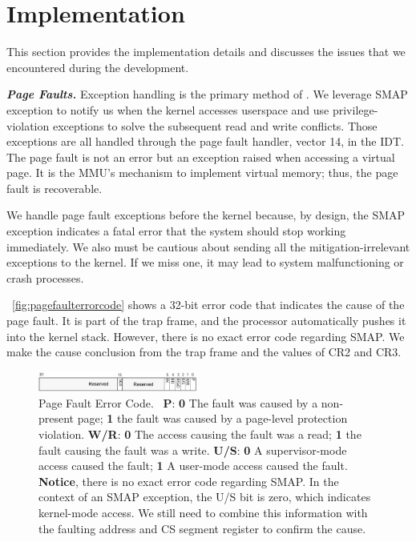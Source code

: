 

\section{Implementation}
\label{sec:ktoctou-implementation}

This section provides the implementation details and discusses the issues that we encountered during the development.


\textbf{\textit{Page Faults.}} Exception handling is the primary method of \name. We leverage SMAP exception to notify us when the kernel accesses userspace and use privilege-violation exceptions to solve the subsequent read and write conflicts. Those exceptions are all handled through the page fault handler, vector 14, in the IDT. The page fault is not an error but an exception raised when accessing a virtual page. It is the MMU's mechanism to implement virtual memory; thus, the page fault is recoverable.

We handle page fault exceptions before the kernel because, by design, the SMAP exception indicates a fatal error that the system should stop working immediately. We also must be cautious about sending all the mitigation-irrelevant exceptions to the kernel. If we miss one, it may lead to system malfunctioning or crash processes.


~\autoref{fig:pagefaulterrorcode} shows a 32-bit error code that indicates the cause of the page fault. It is part of the trap frame, and the processor automatically pushes it into the kernel stack. However, there is no exact error code regarding SMAP.  We make the cause conclusion from the trap frame and the values of CR2 and CR3.


\begin{figure}[th]
  \includegraphics[width=0.47\textwidth]{figures/pagefaulterrorcode2}
  \centering
  \caption{Page Fault Error Code.~\cite{intelinterrupt} \textbf{P}: \textbf{0} The fault was caused by a non-present page; \textbf{1} the fault was caused by a page-level protection violation. \textbf{W/R}: \textbf{0} The access causing the fault was a read; \textbf{1} the fault causing the fault was a write. \textbf{U/S}: \textbf{0} A supervisor-mode access caused the fault; \textbf{1} A user-mode access caused the fault. \textbf{Notice}, there is no exact error code regarding SMAP. In the context of an SMAP exception, the U/S bit is zero, which indicates kernel-mode access. We still need to combine this information with the faulting address and CS segment register to confirm the cause.}
  \label{fig:pagefaulterrorcode}
\end{figure}


